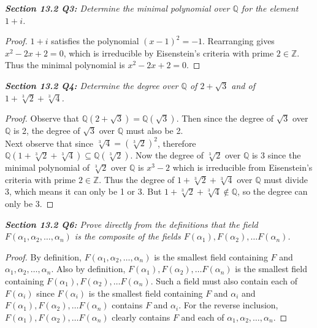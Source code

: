 \documentclass{article}
\begin{document}
\it \textbf{Section 13.2 Q3:} Determine the minimal polynomial over
  $\mathbb{Q}$ for the element $1+i$.

  \begin{proof}
    $1+i$ satisfies the polynomial $(x-1)^2=-1$. Rearranging gives
    $x^2-2x+2=0$, which is irreducible by Eisenstein's criteria with prime
    $2\in\mathbb{Z}$. Thus the minimal polynomial is $x^2-2x+2=0$.
  \end{proof}

\it \textbf{Section 13.2 Q4:} Determine the degree over $\mathbb{Q}$ of
  $2+\sqrt{3}$ and of $1+\sqrt[3]{2}+\sqrt[3]{4}$.

  \begin{proof}
    Observe that $\mathbb{Q}(2+\sqrt{3}) =\mathbb{Q}(\sqrt{3})$. Then since
    the degree of $\sqrt{3}$ over $\mathbb{Q}$ is 2, the degree of
    $\sqrt{3}$ over $\mathbb{Q}$ must also be 2. \\

    Next observe that since $\sqrt[3]{4}=(\sqrt[3]{2})^2$, therefore
    $\mathbb{Q}(1+\sqrt[3]{2}+\sqrt[3]{4})\subseteq
    \mathbb{Q}(\sqrt[3]{2})$. Now the degree of $\sqrt[3]{2}$ over
    $\mathbb{Q}$ is 3 since the minimal polynomial of $\sqrt[3]{2}$ over
    $\mathbb{Q}$ is $x^3-2$ which is irreducible from Eisenstein's criteria
    with prime $2\in\mathbb{Z}$. Thus the degree of
    $1+\sqrt[3]{2}+\sqrt[3]{4}$ over $\mathbb{Q}$ must divide 3, which
    means it can only be 1 or 3. But
    $1+\sqrt[3]{2}+\sqrt[3]{4}\not\in\mathbb{Q}$, so the degree can only be
    3.
  \end{proof}

\it \textbf{Section 13.2 Q6:} Prove directly from the definitions that the
  field $F(\alpha_1,\alpha_2,\ldots,\alpha_n)$ is the composite of the
  fields $F(\alpha_1),F(\alpha_2),\ldots F(\alpha_n)$.

  \begin{proof}
    By definition, $F(\alpha_1,\alpha_2,\ldots,\alpha_n)$ is the smallest
    field containing $F$ and $\alpha_1,\alpha_2,\ldots,\alpha_n$. Also by
    definition, $F(\alpha_1),F(\alpha_2),\ldots F(\alpha_n)$ is the
    smallest field containing $F(\alpha_1),F(\alpha_2),\ldots F(\alpha_n)$.
    Such a field must also contain each of $F(\alpha_i)$ since
    $F(\alpha_i)$ is the smallest field containing $F$ and $\alpha_i$ and
    $F(\alpha_1),F(\alpha_2),\ldots F(\alpha_n)$ contains $F$ and
    $\alpha_i$. For the reverse inclusion, $F(\alpha_1),F(\alpha_2),\ldots
    F(\alpha_n)$ clearly contains $F$ and each of
    $\alpha_1,\alpha_2,\ldots,\alpha_n$.
  \end{proof}
\end{document}
